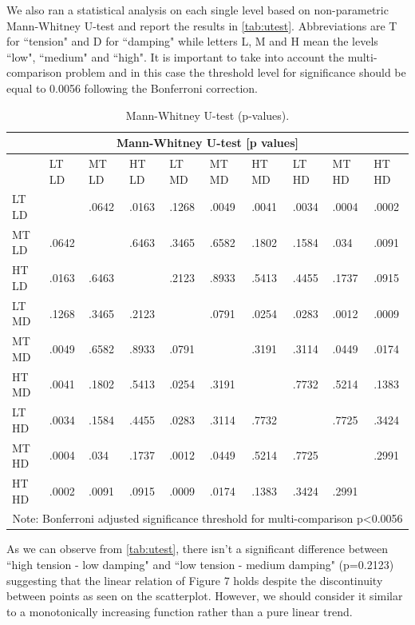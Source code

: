 \documentclass{article}
\begin{document}
We also ran a statistical analysis on each single level based on non-parametric Mann-Whitney U-test and report the results in \autoref{tab:utest}. Abbreviations are T for ``tension" and D for ``damping" while letters L, M and H mean the levels ``low", ``medium" and ``high". It is important to take into account the multi-comparison problem and in this case the threshold level for significance should be equal to 0.0056 following the Bonferroni correction.

\def \columnW {0.33cm}
\begin{table}[h!]
\tiny
\caption{Mann-Whitney U-test (p-values).}
\begin{tabular}{ |p{0.7cm}||p{\columnW}|p{\columnW}|p{\columnW}|p{\columnW}|p{\columnW}|p{\columnW}|p{\columnW}|p{\columnW}|p{\columnW}|  }
 \hline
 \multicolumn{10}{|c|}{Mann-Whitney U-test [p values]} \\
 \hline
  & LT LD & MT LD & HT LD & LT MD & MT MD & HT MD & LT HD & MT HD & HT HD \\
 \hline
LT LD &	 &.0642 &.0163 &.1268 &.0049 &.0041 &.0034 &.0004 &.0002\\
\hline
MT LD &.0642 &	 &.6463 &.3465 &.6582 &.1802 &.1584 &.034 &.0091\\
\hline
HT LD &.0163 &.6463 &	 &.2123 &.8933 &.5413 &.4455 &.1737 &.0915\\
\hline
LT MD &.1268 &.3465 &.2123 &	 &.0791 &.0254 &.0283 &.0012 &.0009\\
\hline
MT MD &.0049 &.6582 &.8933 &.0791 &	 &.3191 &.3114 &.0449 &.0174\\
\hline
HT MD &.0041 &.1802 &.5413 &.0254 &.3191 &	 &.7732 &.5214 &.1383\\
\hline
LT HD &.0034 &.1584 &.4455 &.0283 &.3114 &.7732 &	 &.7725 &.3424\\
\hline
MT HD &.0004 &.034 &.1737 &.0012 &.0449 &.5214 &.7725 &	 &.2991\\
\hline
HT HD &.0002 &.0091 &.0915 &.0009 &.0174 &.1383 &.3424 &.2991 &	\\

 \hline
 \multicolumn{10}{|c|}{Note: Bonferroni adjusted significance threshold for multi-comparison p\textless0.0056} \\
 \hline
\end{tabular}
\label{tab:utest}
\end{table}

As we can observe from \autoref{tab:utest}, there isn't a significant difference between ``high tension - low damping" and ``low tension - medium damping" (p=0.2123) suggesting that the linear relation of Figure 7 holds despite the discontinuity between points as seen on the scatterplot. However, we should consider it similar to a monotonically increasing function rather than a pure linear trend. 
\end{document}

